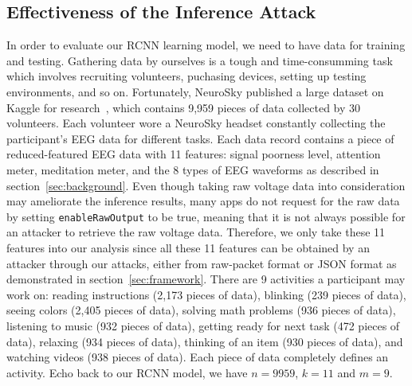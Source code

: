 \subsection{Effectiveness of the Inference Attack}
In order to evaluate our RCNN learning model, we need to have data for training and testing. Gathering data by ourselves is a tough and time-consumming task which involves recruiting volunteers, puchasing devices, setting up testing environments, and so on. Fortunately, NeuroSky published a large dataset on Kaggle for research~\cite{neuroskydata}, which contains 9,959 pieces of data collected by 30 volunteers. Each volunteer wore a NeuroSky headset constantly collecting the participant's EEG data for different tasks. Each data record contains a piece of reduced-featured EEG data with 11 features: signal poorness level, attention meter, meditation meter, and the 8 types of EEG waveforms as described in section~\ref{sec:background}. Even though taking raw voltage data into consideration may ameliorate the inference results, many apps do not request for the raw data by setting \texttt{enableRawOutput} to be true, meaning that it is not always possible for an attacker to retrieve the raw voltage data. Therefore, we only take these 11 features into our analysis since all these 11 features can be obtained by an attacker through our attacks, either from raw-packet format or JSON format as demonstrated in section~\ref{sec:framework}. There are 9 activities a participant may work on: reading instructions (2,173 pieces of data), blinking (239 pieces of data), seeing colors (2,405 pieces of data), solving math problems (936 pieces of data), listening to music (932 pieces of data), getting ready for next task (472 pieces of data), relaxing (934 pieces of data), thinking of an item (930 pieces of data), and watching videos (938 pieces of data). Each piece of data completely defines an activity. Echo back to our RCNN model, we have $n=9959$, $k=11$ and $m=9$.\\
%
